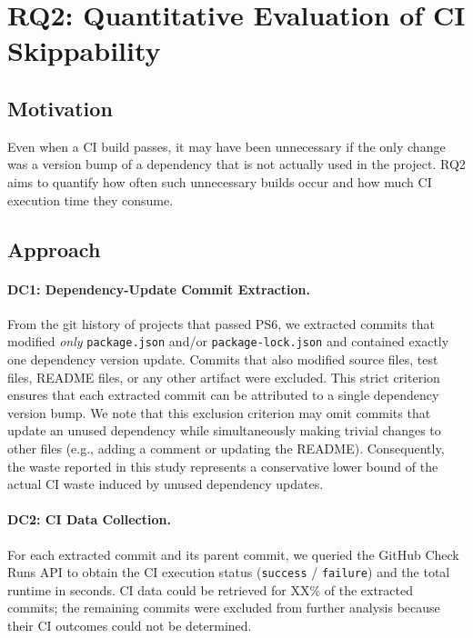 \section{RQ2: Quantitative Evaluation of CI Skippability}
\label{sec:rq2}

\subsection{Motivation}

Even when a CI build passes, it may have been unnecessary if the only
change was a version bump of a dependency that is not actually used in
the project.
RQ2 aims to quantify how often such unnecessary builds occur and how
much CI execution time they consume.

\subsection{Approach}

\paragraph{DC1: Dependency-Update Commit Extraction.}
From the git history of projects that passed PS6, we extracted commits
that modified \emph{only} \texttt{package.json} and/or
\texttt{package-lock.json} and contained exactly one dependency version
update.
Commits that also modified source files, test files, README files, or
any other artifact were excluded.
This strict criterion ensures that each extracted commit can be
attributed to a single dependency version bump.
We note that this exclusion criterion may omit commits that update an
unused dependency while simultaneously making trivial changes to other
files (e.g., adding a comment or updating the README).
Consequently, the waste reported in this study represents a conservative
lower bound of the actual CI waste induced by unused dependency updates.

\paragraph{DC2: CI Data Collection.}
For each extracted commit and its parent commit, we queried the GitHub
Check Runs API to obtain the CI execution status
(\texttt{success} / \texttt{failure}) and the total runtime in seconds.
CI data could be retrieved for XX\% of the extracted commits; the
remaining commits were excluded from further analysis because their
CI outcomes could not be determined.

